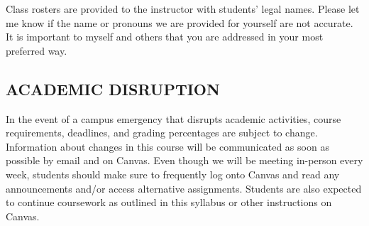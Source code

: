 \documentclass[11pt]{article}
\begin{document}
Class rosters are provided to the instructor with students' legal names.
Please let me know if the name or pronouns we are provided for yourself are not accurate.
It is important to myself and others that you are addressed in your most preferred way.

\subsection*{ACADEMIC DISRUPTION}
In the event of a campus emergency that disrupts academic activities, course requirements, deadlines, and grading percentages are subject to change. 
Information about changes in this course will be communicated as soon as possible by email and on Canvas. 
Even though we will be meeting in-person every week, students should make sure to frequently log onto Canvas and read any announcements and/or access alternative assignments. 
Students are also expected to continue coursework as outlined in this syllabus or other instructions on Canvas. 

\newpage

%
\end{document}
